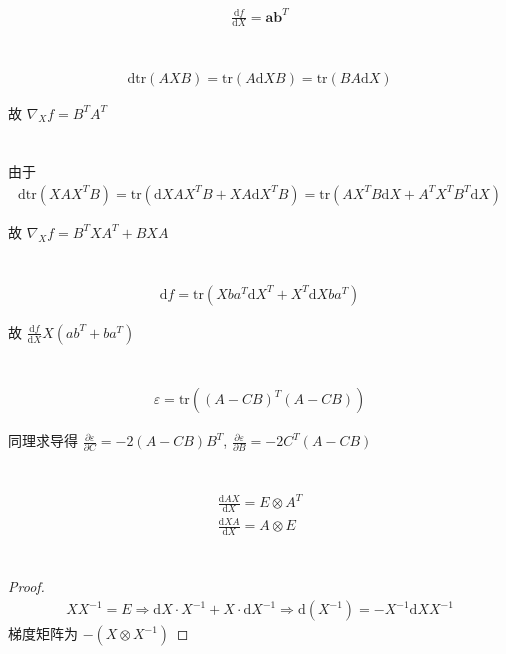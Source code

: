 \documentclass{article}
\newcommand{\dd}{\mathrm{d}}
\begin{document}
\begin{align*}
    \frac{\dd f}{\dd X} = \boldsymbol{a}\boldsymbol{b}^T
\end{align*}

\section{}

\begin{align*}
    \dd \mathrm{tr}(AXB) = \mathrm{tr} (A \dd X B) = \mathrm{tr} (BA\dd X)
\end{align*}

故 $\nabla_X f = B^TA^T$

\section{}

由于 \begin{align*}
    \dd \mathrm{tr} (XAX^TB) = \mathrm{tr} (\dd X AX^TB + XA\dd X^T B) = \mathrm{tr} (AX^TB \dd X + A^TX^TB^T\dd X)
\end{align*}

故 $\nabla_X f = B^TXA^T + BXA$

\section{}

\begin{align*}
    \dd f = \mathrm{tr} (Xba^T\dd X^T + X^T \dd X ba^T)
\end{align*}

故 $\frac{\dd f}{\dd X}X(ab^T + ba^T)$

\section{}

\begin{align*}
    \varepsilon = \mathrm{tr} ((A - CB)^T(A - CB))
\end{align*}

同理求导得 $\frac{\partial \varepsilon}{\partial C} = -2(A - CB)B^T$, $\frac{\partial \varepsilon}{\partial B} = -2C^T(A - CB)$

\section{}

\begin{align*}
    \frac{\dd AX}{\dd X} = E \otimes A^T \\
    \frac{\dd XA}{\dd X} = A \otimes E
\end{align*}

\section{}

\begin{proof}
    \begin{align*}
        XX^{-1} = E \Rightarrow \dd X \cdot X^{-1} + X\cdot \dd X^{-1} \Rightarrow \dd (X^{-1}) = -X^{-1} \dd X X^{-1}
    \end{align*}
    梯度矩阵为 $-\left(X \otimes X^{-1}\right)$
\end{proof}
\end{document}
